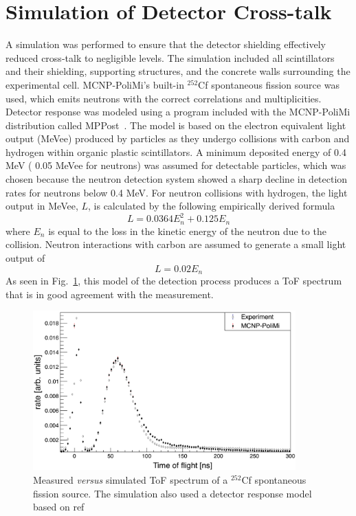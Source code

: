 \section{Simulation of Detector Cross-talk}
A simulation was performed to ensure that the detector shielding effectively reduced cross-talk to negligible levels.
The simulation included all scintillators and their shielding, supporting structures, and the concrete walls surrounding the experimental cell.
MCNP-PoliMi's built-in $^{252}$Cf spontaneous fission source was used, which emits neutrons with the correct correlations and multiplicities.
Detector response was modeled using a program included with the MCNP-PoliMi distribution called MPPost~\cite{MPPost}.
The model is based on the electron equivalent light output (MeVee) produced by particles as they undergo collisions with carbon and hydrogen within organic plastic scintillators.
A minimum deposited energy of 0.4 MeV ( 0.05 MeVee for neutrons) was assumed for detectable particles, which was chosen because the neutron detection system showed a sharp decline in detection rates for neutrons below 0.4 MeV.
For neutron collisions with hydrogen, the light output in MeVee, $L$, is calculated by the following empirically derived formula
\begin{displaymath}
L = 0.0364 E_n^2 +  0.125 E_n
\end{displaymath}
where $E_n$ is equal to the loss in the kinetic energy of the neutron due to the collision.
Neutron interactions with carbon are assumed to generate a small light output of
\begin{displaymath}
L = 0.02 E_n
\end{displaymath}
As seen in Fig.~\ref{fig:Cf252MCNPVsEXP}, this model of the detection process produces a ToF spectrum that is in good agreement with the measurement.
\begin{figure}
    \centering
    \includegraphics[width = 0.9\textwidth]{Content/Errors/Cf252MCNPVsEXP.png}
    \caption{Measured \emph{versus} simulated ToF spectrum of a $^{252}$Cf spontaneous fission source. 
    The simulation also used a detector response model based on ref~\cite{MPPost}}
    \label{fig:Cf252MCNPVsEXP}
\end{figure}

